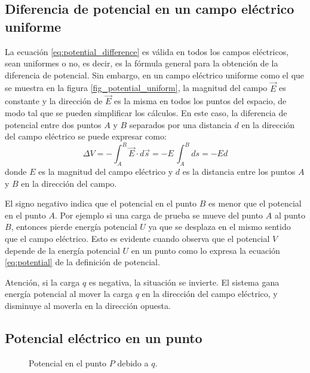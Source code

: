 \subsection{Diferencia de potencial en un campo eléctrico uniforme}


La ecuación \eqref{eq:potential_difference} es válida en todos los campos eléctricos, sean uniformes o no, es decir, es la fórmula general para la obtención de la diferencia de potencial. Sin embargo, en un campo eléctrico uniforme como el que se muestra en la figura \ref{fig_potential_uniform}, la magnitud del campo \(\vec{E}\) es constante y la dirección de \(\vec{E}\) es la misma en todos los puntos del espacio, de modo tal que se pueden simplificar los cálculos. En este caso, la diferencia de potencial entre dos puntos \(A\) y \(B\) separados por una distancia \(d\) en la dirección del campo eléctrico se puede expresar como:
\begin{equation}
  \Delta V = -\int_A^B \vec{E} \cdot d\vec{s} = -E \, \int_A^B ds = \boxed{-Ed}
  \label{eq:potential_uniform}
\end{equation}
donde \(E\) es la magnitud del campo eléctrico y \(d\) es la distancia entre los puntos \(A\) y \(B\) en la dirección del campo.

El signo negativo indica que el potencial en el punto \(B\) es menor que el potencial en el punto \(A\). Por ejemplo si una carga de prueba se mueve del punto \(A\) al punto \(B\), entonces pierde energía potencial \(U\) ya que se desplaza en el mismo sentido que el campo eléctrico. Esto es evidente cuando observa que el potencial \(V\) depende de la energía potencial \(U\) en un punto como lo expresa la ecuación \eqref{eq:potential} de la definición de potencial.

\begin{tcolorbox}[mydanger]
  Atención, si la carga \(q\) es negativa, la situación se invierte. El sistema gana energía potencial al mover la carga \(q\) en la dirección del campo eléctrico, y disminuye al moverla en la dirección opuesta.    
\end{tcolorbox}

\subsection{Potencial eléctrico en un punto}

\begin{figure}[!ht]
  \centering
  
  \caption{Potencial en el punto \(P\) debido a \(q\).}
  \label{fig_potencial_en_un_punto}
\end{figure}


